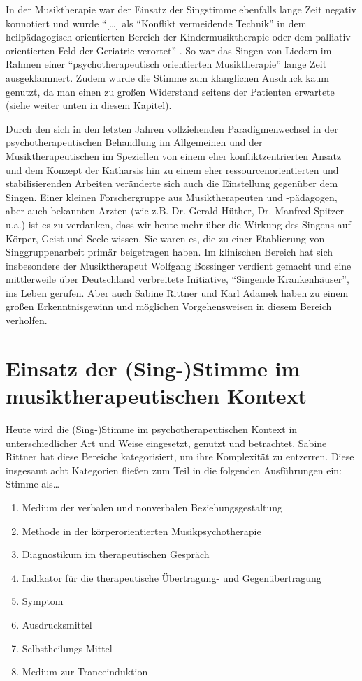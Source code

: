 In der Musiktherapie war der Einsatz der Singstimme ebenfalls lange Zeit negativ konnotiert und wurde "`[\ldots] als "`Konflikt vermeidende Technik"' in dem heilpädagogisch orientierten Bereich der Kindermusiktherapie oder dem palliativ orientierten Feld der Geriatrie verortet"' \autocite[10]{wolf2012}. So war das Singen von Liedern im Rahmen einer "`psychotherapeutisch orientierten Musiktherapie"' lange Zeit ausgeklammert. Zudem wurde die Stimme zum klanglichen Ausdruck kaum genutzt, da man einen zu großen Widerstand seitens der Patienten erwartete (siehe weiter unten in diesem Kapitel). 

Durch den sich in den letzten Jahren vollziehenden Paradigmenwechsel in der psychotherapeutischen Behandlung im Allgemeinen und der Musiktherapeutischen im Speziellen von einem eher konfliktzentrierten Ansatz und dem Konzept der Katharsis hin zu einem eher ressourcenorientierten und stabilisierenden Arbeiten veränderte sich auch die Einstellung gegenüber dem Singen\autocite[vgl.][11]{wolf2012}. Einer kleinen Forschergruppe aus Musiktherapeuten und -pädagogen, aber auch bekannten Ärzten (wie z.B. Dr. Gerald Hüther, Dr. Manfred Spitzer u.a.) ist es zu verdanken, dass wir heute mehr über die Wirkung des Singens auf Körper, Geist und Seele wissen. Sie waren es, die zu einer Etablierung von Singgruppenarbeit primär beigetragen haben. Im klinischen Bereich hat sich insbesondere der Musiktherapeut Wolfgang Bossinger verdient gemacht und eine mittlerweile über Deutschland verbreitete Initiative, "`Singende Krankenhäuser"', ins Leben gerufen. Aber auch Sabine Rittner und Karl Adamek haben zu einem großen Erkenntnisgewinn und möglichen Vorgehensweisen in diesem Bereich verholfen.

\section{Einsatz der (Sing-)Stimme im musiktherapeutischen Kontext}

Heute wird die (Sing-)Stimme im psychotherapeutischen Kontext in unterschiedlicher Art und Weise eingesetzt, genutzt und betrachtet. Sabine Rittner \autocite[vgl.][204 ff.]{rittner2008} hat diese Bereiche kategorisiert, um ihre Komplexität zu entzerren. Diese insgesamt acht Kategorien fließen zum Teil in die folgenden Ausführungen ein: 
Stimme als\ldots
\begin{enumerate}
\item Medium der verbalen und nonverbalen Beziehungsgestaltung
\item Methode in der körperorientierten Musikpsychotherapie
\item Diagnostikum im therapeutischen Gespräch
\item Indikator für die therapeutische Übertragung- und Gegenübertragung
\item Symptom
\item Ausdrucksmittel
\item Selbstheilungs-Mittel
\item Medium zur Tranceinduktion
\end{enumerate}

